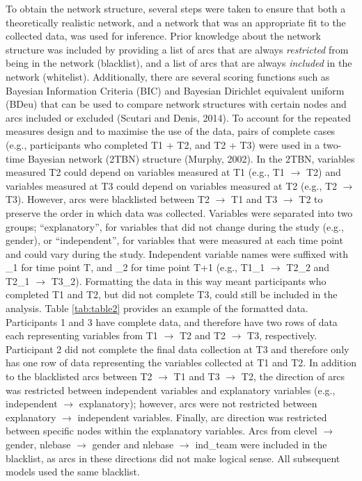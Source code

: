\documentclass[utf8]{frontiersHLTH}
\begin{document}
To obtain the network structure, several steps were taken to ensure that
both a theoretically realistic network, and a network that was an
appropriate fit to the collected data, was used for inference. Prior
knowledge about the network structure was included by providing a list
of arcs that are always \emph{restricted} from being in the network
(blacklist), and a list of arcs that are always \emph{included} in the
network (whitelist). Additionally, there are several scoring functions
such as Bayesian Information Criteria (BIC) and Bayesian Dirichlet
equivalent uniform (BDeu) that can be used to compare network structures
with certain nodes and arcs included or excluded (Scutari and Denis,
2014). To account for the repeated measures design and to maximise the
use of the data, pairs of complete cases (e.g., participants who
completed T1 + T2, and T2 + T3) were used in a two-time Bayesian network
(2TBN) structure (Murphy, 2002). In the 2TBN, variables measured T2
could depend on variables measured at T1 (e.g., T1 \(\rightarrow\) T2)
and variables measured at T3 could depend on variables measured at T2
(e.g., T2 \(\rightarrow\) T3). However, arcs were blacklisted between T2
\(\rightarrow\) T1 and T3 \(\rightarrow\) T2 to preserve the order in
which data was collected. Variables were separated into two groups;
``explanatory'', for variables that did not change during the study
(e.g., gender), or ``independent'', for variables that were measured at
each time point and could vary during the study. Independent variable
names were suffixed with \_1 for time point T, and \_2 for time point
T+1 (e.g., T1\_1 \(\rightarrow\) T2\_2 and T2\_1 \(\rightarrow\) T3\_2).
Formatting the data in this way meant participants who completed T1 and
T2, but did not complete T3, could still be included in the analysis.
Table \ref{tab:table2} provides an example of the formatted data.
Participants 1 and 3 have complete data, and therefore have two rows of
data each representing variables from T1 \(\rightarrow\) T2 and T2
\(\rightarrow\) T3, respectively. Participant 2 did not complete the
final data collection at T3 and therefore only has one row of data
representing the variables collected at T1 and T2. In addition to the
blacklisted arcs between T2 \(\rightarrow\) T1 and T3 \(\rightarrow\)
T2, the direction of arcs was restricted between independent variables
and explanatory variables (e.g., independent \(\rightarrow\)
explanatory); however, arcs were not restricted between explanatory
\(\rightarrow\) independent variables. Finally, arc direction was
restricted between specific nodes within the explanatory variables. Arcs
from clevel \(\rightarrow\) gender, nlebase \(\rightarrow\) gender and
nlebase \(\rightarrow\) ind\_team were included in the blacklist, as
arcs in these directions did not make logical sense. All subsequent
models used the same blacklist.
\end{document}
